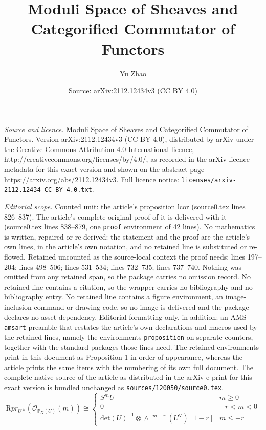 \documentclass[10pt,a4paper]{amsart}
\title{Moduli Space of Sheaves and Categorified Commutator of Functors}
\author{Yu Zhao}
\date{Source: arXiv:2112.12434v3 (CC BY 4.0)}
\newcommand\mb{\mathbb}
\begin{document}
\maketitle

\noindent\emph{Source and licence.} Moduli Space of Sheaves and Categorified Commutator of Functors. Version arXiv:2112.12434v3 (CC BY 4.0), distributed by arXiv under the Creative Commons Attribution 4.0 International licence, http://creativecommons.org/licenses/by/4.0/, as recorded in the arXiv licence metadata for this exact version and shown on the abstract page https://arxiv.org/abs/2112.12434v3. Full licence notice: \texttt{licenses/arxiv-2112.12434-CC-BY-4.0.txt}.\par\smallskip

\noindent\textit{Editorial scope.} Counted unit: the article's proposition lcor (source0.tex lines 826--837). The article's complete original proof of it is delivered with it (source0.tex lines 838--879, one \texttt{proof} environment of 42 lines). No mathematics is written, repaired or re-derived: the statement and the proof are the article's own lines, in the article's own notation, and no retained line is substituted or re-flowed.  Retained uncounted as the source-local context the proof needs: lines 197--204; lines 498--506; lines 531--534; lines 732--735; lines 737--740.  Nothing was omitted from any retained span, so the package carries no omission record.  No retained line contains a citation, so the wrapper carries no bibliography and no bibliography entry.  No retained line contains a figure environment, an image-inclusion command or drawing code, so no image is delivered and the package declares no asset dependency.  Editorial formatting only, in addition: an AMS \texttt{amsart} preamble that restates the article's own declarations and macros used by the retained lines, namely the environments \texttt{proposition} on separate counters, together with the standard packages those lines need.  The retained environments print in this document as Proposition 1 in order of appearance, whereas the article prints the same items with the numbering of its own full document.  The complete native source of the article as distributed in the arXiv e-print for this exact version is bundled unchanged as \texttt{sources/120050/source0.tex}.
  \begin{equation}
\label{hart}
     \mathrm{R}pr_{U*}(\mathcal{O}_{\mb{P}_{X}(U)}(m))\cong  \begin{cases}
      S^{m}U & m\geq 0\\
      0 & -r<m<0 \\
      \mathrm{det}(U)^{-1}\otimes \wedge^{-m-r}(U^{\vee})[1-r]& m\leq -r  
    \end{cases}
  \end{equation}
\end{document}
